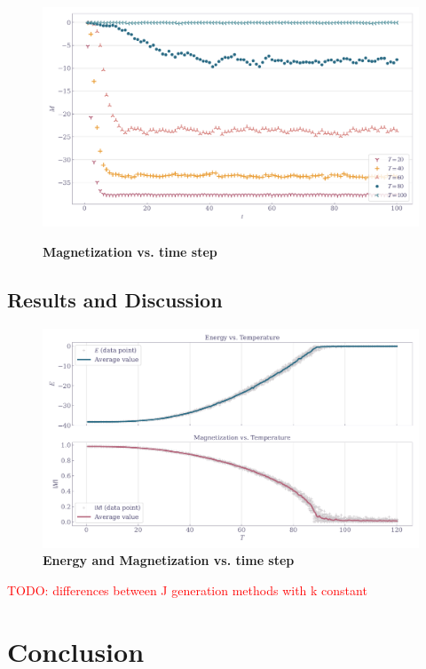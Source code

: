 \documentclass[11pt,a4paper]{article}
\newcommand{\todo}[1]{\textcolor{red}{TODO: #1}}
\begin{document}
\begin{figure}[ht!]
    \centering
    \caption{\textbf{Magnetization vs. time step}}
    \includegraphics[width=\linewidth]{../figures/magnet_vs_steps.pdf}
    \label{fig:mag_vs_time}
\end{figure}

\subsection{Results and Discussion}

\begin{figure}[ht!]
    \centering
    \caption{\textbf{Energy and Magnetization vs. time step}}
    \includegraphics[width=\linewidth]{../figures/energy_magnet_vs_temp.pdf}
\end{figure}



\todo{differences between J generation methods with k constant}

\section{Conclusion}
\end{document}

